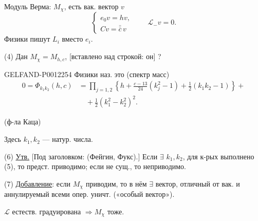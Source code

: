 Модуль Верма: \(M_\chi\), есть вак. вектор \(v\)
\begin{equation*}
\begin{cases}
e_0v=hv,\\
Cv=\bar{\bar{c}}\,v
\end{cases}
\qquad\mathcal L_-v=0.\tag{3}
\end{equation*}
Физики пишут \(L_i\) вместо \(e_i\).

(4) Дан \(M_\chi=M_{h,c}\),  [вставлено над строкой: он]
?

\begin{GelfandAdjacentEvidence}{GELFAND-P001225}{4}
Физики наз. это  (спектр масс)
\begin{equation*}
\begin{aligned}
0=\Phi_{k_1k_2}(h,c)
&=\prod_{j=1,2}\left\{h+\frac{c-13}{24}(k_j^2-1)+\frac12(k_1k_2-1)\right\}+\\
&\quad+\frac12(k_1^2-k_2^2)^2.
\end{aligned}\tag{5}
\end{equation*}
\end{GelfandAdjacentEvidence}


(ф-ла Каца)

Здесь \(k_1,k_2\) --- натур. числа.

(6) \underline{Утв.} [Под заголовком: (Фейгин, Фукс).]
Если \(\exists\) \(k_1,k_2\), для к-рых выполнено (5), то предст. приводимо; если не сущ., то неприводимо.

(7) \underline{Добавление}: если \(M_\chi\) приводим, то в нём
\(\exists\) вектор, отличный от вак. и аннулируемый всеми опер. уничт. («особый вектор»).

\(\mathcal L\) естеств. градуирована \(\Rightarrow M_\chi\) тоже.


